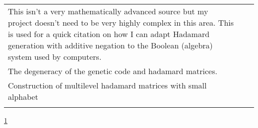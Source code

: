 \documentclass{article}
\begin{document}
{\begin{center}
\begin{longtable}{p{5cm} p{5cm} p{5cm}}
    This isn't a very mathematically advanced source but my project doesn't
    need to be very highly complex in this area. This is used for a quick
    citation on how I can adapt Hadamard generation with additive negation to
    the Boolean (algebra) system used by computers.

    \\

    The degeneracy of the genetic code and hadamard matrices. \citep*{DegeneracyHadamard2008Petoukhov}

    \\

    Construction of multilevel hadamard matrices with small alphabet \citep*{MultilevelConstruction2008TrinhFan}

    \\

    \bottomrule
    \label{tab:sourceeval}
    \end{longtable}
    \end{center}
    }

    \ref{tab:sourceeval}

    
    
\end{document}
